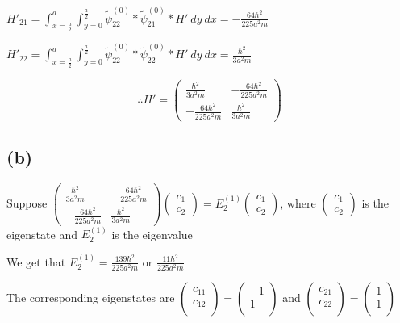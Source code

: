 \documentclass[12pt]{article}
\begin{document}
\begin{spacing}{2.0}
$H'_{21}=\int_{x=\frac{a}{2}}^a \int_{y=0}^{\frac{a}{2}} \widetilde{\psi}_{22}^{(0)}* \widetilde{\psi}_{21}^{(0)}* H'\ dy\ dx=-\frac{64 \hbar ^2}{225 a^2 m}$

$H'_{22}=\int_{x=\frac{a}{2}}^a \int_{y=0}^{\frac{a}{2}} \widetilde{\psi}_{22}^{(0)}* \widetilde{\psi}_{22}^{(0)}* H'\ dy\ dx=\frac{\hbar ^2}{3 a^2 m}$

$$\therefore \boxed{ H'=\left(
\begin{array}{cc}
\frac{\hbar ^2}{3 a^2 m} & -\frac{64 \hbar ^2}{225 a^2 m} \\
-\frac{64 \hbar ^2}{225 a^2 m} & \frac{\hbar ^2}{3 a^2 m}
\end{array}
\right) }$$

\subsection*{(b)}
Suppose $\left(
\begin{array}{cc}
\frac{\hbar ^2}{3 a^2 m} & -\frac{64 \hbar ^2}{225 a^2 m} \\
-\frac{64 \hbar ^2}{225 a^2 m} & \frac{\hbar ^2}{3 a^2 m}
\end{array}
\right)\left(
\begin{array}{c}
c_1\\
c_2
\end{array}
\right)=E_2^{(1)}\left(
\begin{array}{c}
c_1\\
c_2
\end{array}
\right)$, where $\left(
\begin{array}{c}
c_1\\
c_2
\end{array}
\right)$ is the eigenstate and $E_2^{(1)}$ is the eigenvalue

We get that $E_2^{(1)}=\boxed{ \frac{139 \hbar ^2}{225 a^2 m}}$ or $\boxed{\frac{11 \hbar ^2}{225 a^2 m}}$

The corresponding eigenstates are $\left(
\begin{array}{c}
c_{11} \\
c_{12} \\
\end{array}
\right)=\boxed{ \left(
\begin{array}{c}
-1 \\
 1 \\
\end{array}
\right) }$ and $\left(
\begin{array}{c}
c_{21} \\
c_{22} \\
\end{array}
\right)=\boxed{ \left(
\begin{array}{c}
 1 \\
 1 \\
\end{array}
\right)}$


\end{spacing}
\end{document}
